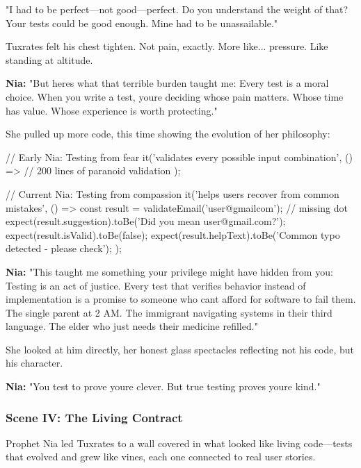 "I had to be perfect---not good---perfect. Do you understand the weight of that? Your tests could be \textquotesingle good enough.\textquotesingle{} Mine had to be unassailable."

Tuxrates felt his chest tighten. Not pain, exactly. More like... pressure. Like standing at altitude.

\textbf{Nia:} "But here\textquotesingle s what that terrible burden taught me: Every test is a moral choice. When you write a test, you\textquotesingle re deciding whose pain matters. Whose time has value. Whose experience is worth protecting."

She pulled up more code, this time showing the evolution of her philosophy:

\begin{codeblock}
// Early Nia: Testing from fear
it('validates every possible input combination', () => {
  // 200 lines of paranoid validation
});

// Current Nia: Testing from compassion  
it('helps users recover from common mistakes', () => {
  const result = validateEmail('user@gmailcom'); // missing dot
  expect(result.suggestion).toBe('Did you mean user@gmail.com?');
  expect(result.isValid).toBe(false);
  expect(result.helpText).toBe('Common typo detected - please check');
});
\end{codeblock}

\textbf{Nia:} "This taught me something your privilege might have hidden from you: Testing is an act of justice. Every test that verifies behavior instead of implementation is a promise to someone who can\textquotesingle t afford for software to fail them. The single parent at 2 AM. The immigrant navigating systems in their third language. The elder who just needs their medicine refilled."

She looked at him directly, her honest glass spectacles reflecting not his code, but his character.

\textbf{Nia:} "You test to prove you\textquotesingle re clever. But true testing proves you\textquotesingle re kind."

\bookdivider

\subsubsection{Scene IV: The Living Contract}\label{scene-iv-the-living-contract}

Prophet Nia led Tuxrates to a wall covered in what looked like living code---tests that evolved and grew like vines, each one connected to real user stories.

